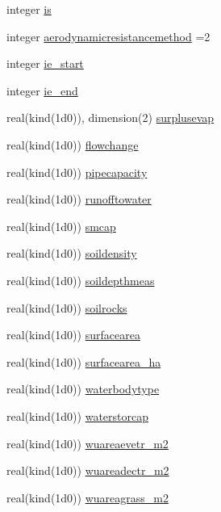 \begin{DoxyCompactItemize}
integer \hyperlink{namespacesues__data_a38a6478771abe06a6cf4334fe858c0ef}{is}
\item 
integer \hyperlink{namespacesues__data_a1780a57f30571faa7263e9cd248a8dd0}{aerodynamicresistancemethod} =2
\item 
integer \hyperlink{namespacesues__data_a64de572d5505a9ff4174a4703db24a9e}{ie\+\_\+start}
\item 
integer \hyperlink{namespacesues__data_a7f97cb4ce39cccee777bae8977654da7}{ie\+\_\+end}
\item 
real(kind(1d0)), dimension(2) \hyperlink{namespacesues__data_a08d117cca68ee0e84a8b286a038434c6}{surplusevap}
\item 
real(kind(1d0)) \hyperlink{namespacesues__data_aafb79a529ff89254c1399e96d77a5fe0}{flowchange}
\item 
real(kind(1d0)) \hyperlink{namespacesues__data_ab2dc1363710dd5d250384fe643279fd7}{pipecapacity}
\item 
real(kind(1d0)) \hyperlink{namespacesues__data_a92f648948ca3627c9bc8442568c4bba1}{runofftowater}
\item 
real(kind(1d0)) \hyperlink{namespacesues__data_a08339a22d19b4766db4ad302512459ba}{smcap}
\item 
real(kind(1d0)) \hyperlink{namespacesues__data_ac26ae7a72cca3b9be662578e90231c4a}{soildensity}
\item 
real(kind(1d0)) \hyperlink{namespacesues__data_ac09e3f2b843f21d26f4f106cb450df06}{soildepthmeas}
\item 
real(kind(1d0)) \hyperlink{namespacesues__data_a5eb41bdf4cc30812b303de4d2acceb67}{soilrocks}
\item 
real(kind(1d0)) \hyperlink{namespacesues__data_a9d6a1e2ae7fe7c36fb4aaa9e2e3c2137}{surfacearea}
\item 
real(kind(1d0)) \hyperlink{namespacesues__data_a77ef6a343e9a419577fa473535ab3c16}{surfacearea\+\_\+ha}
\item 
real(kind(1d0)) \hyperlink{namespacesues__data_a6433e676b899356c4023713d7a5ab589}{waterbodytype}
\item 
real(kind(1d0)) \hyperlink{namespacesues__data_adf49f9058cfb8894abba11870ace90bf}{waterstorcap}
\item 
real(kind(1d0)) \hyperlink{namespacesues__data_a167fa54ed7df9e23b3dac81232961fa3}{wuareaevetr\+\_\+m2}
\item 
real(kind(1d0)) \hyperlink{namespacesues__data_a3dd16ee1aeeae265f322b0982f33a321}{wuareadectr\+\_\+m2}
\item 
real(kind(1d0)) \hyperlink{namespacesues__data_a9d58cea1a78af7ae81ee097bde9e0ef4}{wuareagrass\+\_\+m2}

\end{DoxyCompactItemize}
